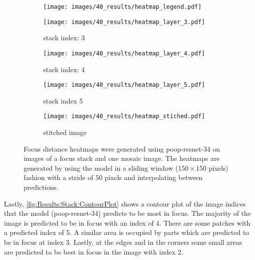 \begin{figure}
    \centering
    \begin{subfigure}[b]{0.75\textwidth}
        \centering
        \texttt{[image: images/40\_results/heatmap\_legend.pdf]}
    \end{subfigure}
    \begin{subfigure}[b]{0.45\textwidth}
        \centering
        \texttt{[image: images/40\_results/heatmap\_layer\_3.pdf]}
        \caption{stack index: 3}
        \label{fig:Results:Stack:HeatMap:Stack3}
        \vspace{1em}
    \end{subfigure}%
    \begin{subfigure}[b]{0.45\textwidth}
        \centering
        \texttt{[image: images/40\_results/heatmap\_layer\_4.pdf]}
        \caption{stack index: 4}
        \label{fig:Results:Stack:HeatMap:Stack4}
        \vspace{1em}
    \end{subfigure}
    \par
    \begin{subfigure}[b]{0.45\textwidth}
        \centering
        \texttt{[image: images/40\_results/heatmap\_layer\_5.pdf]}
        \caption{stack index 5}
        \label{fig:Results:Stack:HeatMap:Stack5}
    \end{subfigure}%
    \begin{subfigure}[b]{0.45\textwidth}
        \centering
        \texttt{[image: images/40\_results/heatmap\_stiched.pdf]}
        \caption{stitched image}
        \label{fig:Results:Stack:HeatMap:Stiched}
    \end{subfigure}
    \caption[Focus distance heatmaps]{Focus distance heatmaps were generated using \acs{poop}-\acs{resnet}-34 on images of a focus stack and one mosaic image. The heatmaps are generated by using the model in a sliding window ($150 \times 150$ pixels) fashion with a stride of $50$ pixels and interpolating between predictions.}
    \label{fig:Results:Stack:HeatMap}
\end{figure}

Lastly, \autoref{fig:Results:Stack:ContourPlot} shows a contour plot of the image indices that the model (\acs{poop}-\acs{resnet}-34) predicts to be most in focus. The majority of the image is predicted to be in focus with an index of 4. There are some patches with a predicted index of 5. A similar area is occupied by parts which are predicted to be in focus at index 3. Lastly, at the edges and in the corners some small areas are predicted to be best in focus in the image with index 2. 

